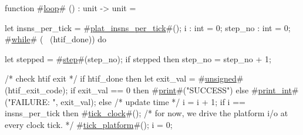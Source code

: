 function #\hyperref[sailRISCVzloop]{loop}# () : unit -> unit = {
  let insns_per_tick = #\hyperref[sailRISCVzplatzyinsnszyperzytick]{plat\_insns\_per\_tick}#();
  i : int = 0;
  step_no : int = 0;
  #\hyperref[sailRISCVzwhile]{while}# (~ (htif_done)) do {
    let stepped = #\hyperref[sailRISCVzstep]{step}#(step_no);
    if stepped then step_no = step_no + 1;

    /* check htif exit */
    if htif_done then {
      let exit_val = #\hyperref[sailRISCVzunsigned]{unsigned}#(htif_exit_code);
      if exit_val == 0 then #\hyperref[sailRISCVzprint]{print}#("SUCCESS")
      else #\hyperref[sailRISCVzprintzyint]{print\_int}#("FAILURE: ", exit_val);
    } else {
      /* update time */
      i = i + 1;
      if i == insns_per_tick then {
        #\hyperref[sailRISCVztickzyclock]{tick\_clock}#();
        /* for now, we drive the platform i/o at every clock tick. */
        #\hyperref[sailRISCVztickzyplatform]{tick\_platform}#();
        i = 0;
      }
    }
  }
}
